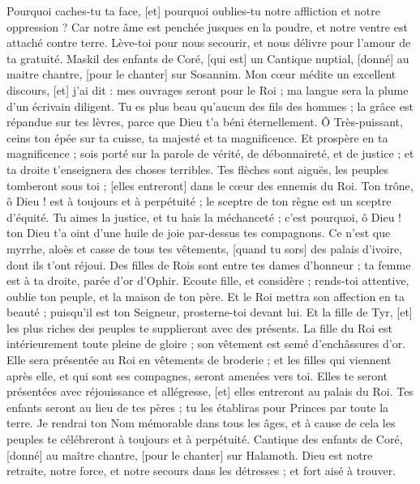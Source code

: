 \begin{multicols}{2}
Pourquoi caches-tu ta face, [et] pourquoi oublies-tu notre affliction et notre oppression ?
Car notre âme est penchée jusques en la poudre, et notre ventre est attaché contre terre.
Lève-toi pour nous secourir, et nous délivre pour l'amour de ta gratuité.
\VerseOne{}Maskil des enfants de Coré, [qui est] un Cantique nuptial, [donné] au maitre chantre, [pour le chanter] sur Sosannim. Mon cœur médite un excellent discours, [et] j'ai dit : mes ouvrages seront pour le Roi ; ma langue sera la plume d'un écrivain diligent.
Tu es plus beau qu'aucun des fils des hommes ; la grâce est répandue sur tes lèvres, parce que Dieu t'a béni éternellement.
Ô Très-puissant, ceins ton épée sur ta cuisse, ta majesté et ta magnificence.
Et prospère en ta magnificence ; sois porté sur la parole de vérité, de débonnaireté, et de justice ; et ta droite t'enseignera des choses terribles.
Tes flèches sont aiguës, les peuples tomberont sous toi ; [elles entreront] dans le cœur des ennemis du Roi.
Ton trône, ô Dieu ! est à toujours et à perpétuité ; le sceptre de ton règne est un sceptre d'équité.
Tu aimes la justice, et tu hais la méchanceté ; c'est pourquoi, ô Dieu ! ton Dieu t'a oint d'une huile de joie par-dessus tes compagnons.
Ce n'est que myrrhe, aloès et casse de tous tes vêtements, [quand tu sors] des palais d'ivoire, dont ils t'ont réjoui.
Des filles de Rois sont entre tes dames d'honneur ; ta femme est à ta droite, parée d'or d'Ophir.
Ecoute fille, et considère ; rends-toi attentive, oublie ton peuple, et la maison de ton père.
Et le Roi mettra son affection en ta beauté ; puisqu'il est ton Seigneur, prosterne-toi devant lui.
Et la fille de Tyr, [et] les plus riches des peuples te supplieront avec des présents.
La fille du Roi est intérieurement toute pleine de gloire ; son vêtement est semé d'enchâssures d'or.
Elle sera présentée au Roi en vêtements de broderie ; et les filles qui viennent après elle, et qui sont ses compagnes, seront amenées vers toi.
Elles te seront présentées avec réjouissance et allégresse, [et] elles entreront au palais du Roi.
Tes enfants seront au lieu de tes pères ; tu les établiras pour Princes par toute la terre.
Je rendrai ton Nom mémorable dans tous les âges, et à cause de cela les peuples te célébreront à toujours et à perpétuité.
\VerseOne{}Cantique des enfants de Coré, [donné] au maître chantre, [pour le chanter] sur Halamoth. Dieu est notre retraite, notre force, et notre secours dans les détresses ; et fort aisé à trouver.

\end{multicols}
